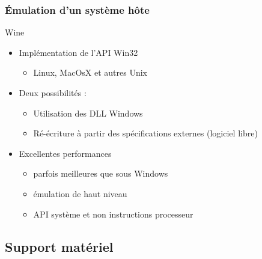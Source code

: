 \begin{frame}
\frametitle{Émulation d'un système hôte}
\begin{exampleblock}{Wine}
\begin{itemize}
\item Implémentation de l'API Win32
\begin{itemize}
\item Linux, MacOsX et autres Unix
\end{itemize}

\item Deux possibilités :
\begin{itemize}
\item Utilisation des DLL Windows
\item Ré-écriture à partir des spécifications externes (logiciel libre)
\end{itemize}
\item Excellentes performances
\begin{itemize}
\item parfois meilleures que sous Windows
\item émulation de haut niveau
\item API système et non instructions processeur
\end{itemize}

\end{itemize}
\end{exampleblock}
\end{frame}

\subsection{Support matériel}


